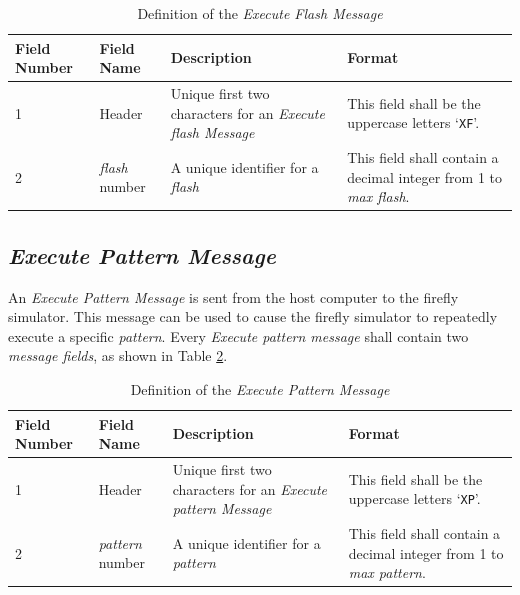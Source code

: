\documentclass[letterpaper,11pt]{article}
\begin{document}
\begin{table}[H]
  \caption{Definition of the \textit{Execute Flash Message}}
  \centering
  \setlength\extrarowheight{2pt}
  \begin{tabular}[h]{|p{0.5in}|p{1.00in}|p{2.25in}|p{2.25in}|} \hline
    Field Number & Field Name & Description & Format \\ \hline
    1            & Header
                 & Unique first two characters for an \textit{Execute flash
                 Message}
                 & This field shall be the uppercase letters `\texttt{XF}'.
                 \\ \hline
    2            & \textit{flash} number
                 & A unique identifier for a \textit{flash}
                 & This field shall contain a decimal integer from 1 to
                 \textit{max flash}.
                 \\ \hline
  \end{tabular}
  \label{tab:ExecuteFlash}
\end{table}

\subsection{\textit{Execute Pattern Message}}

An \textit{Execute Pattern Message} is sent from the host computer to the
firefly simulator. This message can be used to cause the firefly simulator to
repeatedly execute a specific \textit{pattern}. Every \textit{Execute pattern
message} shall contain two \textit{message fields}, as shown in Table
\ref{tab:ExecutePattern}.

\begin{table}[H]
  \caption{Definition of the \textit{Execute Pattern Message}}
  \centering
  \setlength\extrarowheight{2pt}
  \begin{tabular}[h]{|p{0.5in}|p{1.00in}|p{2.25in}|p{2.25in}|} \hline
    Field Number & Field Name & Description & Format \\ \hline
    1            & Header
                 & Unique first two characters for an \textit{Execute pattern
                 Message}
                 & This field shall be the uppercase letters `\texttt{XP}'.
                 \\ \hline
    2            & \textit{pattern} number
                 & A unique identifier for a \textit{pattern}
                 & This field shall contain a decimal integer from 1 to
                 \textit{max pattern}.
                 \\ \hline
  \end{tabular}
  \label{tab:ExecutePattern}
\end{table}
\end{document}
